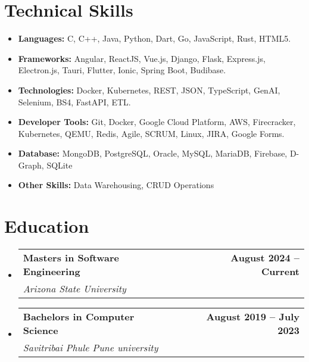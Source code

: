 \documentclass[letterpaper,11pt]{article}
\makeatletter
\newcommand{\resumeItem}[1]{
  \item\small{
    {#1 \vspace{-2pt}}
  }
}
\newcommand{\resumeSubheading}[4]{
  \vspace{-2pt}\item
    \begin{tabular*}{0.97\textwidth}[t]{l@{\extracolsep{\fill}}r}
      \textbf{\small#1} & \textbf{\small#2} \\
      \textit{\small#3} & \textit{\small#4} \\
    \end{tabular*}\vspace{-7pt}
}
\newcommand{\resumeSubItem}[1]{\resumeItem{#1}\vspace{-4pt}}
\newcommand{\resumeSubHeadingListStart}{\begin{itemize}[leftmargin=0.15in, label={}]}
\newcommand{\resumeSubHeadingListEnd}{\end{itemize}}
\makeatother
\begin{document}
\section{Technical Skills}
\resumeSubHeadingListStart
  \resumeSubItem{\textbf{Languages:} C, C++, Java, Python, Dart, Go, JavaScript, Rust, HTML5.}
  \resumeSubItem{\textbf{Frameworks:} Angular, ReactJS, Vue.js, Django, Flask, Express.js, Electron.js, Tauri, Flutter, Ionic, Spring Boot, Budibase.}
  \resumeSubItem{\textbf{Technologies:} Docker, Kubernetes, REST, JSON, TypeScript, GenAI, Selenium, BS4, FastAPI, ETL.}
  \resumeSubItem{\textbf{Developer Tools:} Git, Docker, Google Cloud Platform, AWS, Firecracker, Kubernetes, QEMU, Redis, Agile, SCRUM, Linux, JIRA, Google Forms.}
  \resumeSubItem{\textbf{Database:} MongoDB, PostgreSQL, Oracle, MySQL, MariaDB, Firebase, D-Graph, SQLite}
  \resumeSubItem{\textbf{Other Skills:} Data Warehousing, CRUD Operations}
\resumeSubHeadingListEnd

\section{Education}
  \resumeSubHeadingListStart
    \resumeSubheading
      {Masters in Software Engineering}{August 2024 -- Current}
      {Arizona State University}{}
    \resumeSubheading
      {Bachelors in Computer Science}{August 2019 -- July 2023}
      {Savitribai Phule Pune university}{}
  \resumeSubHeadingListEnd
\end{document}
